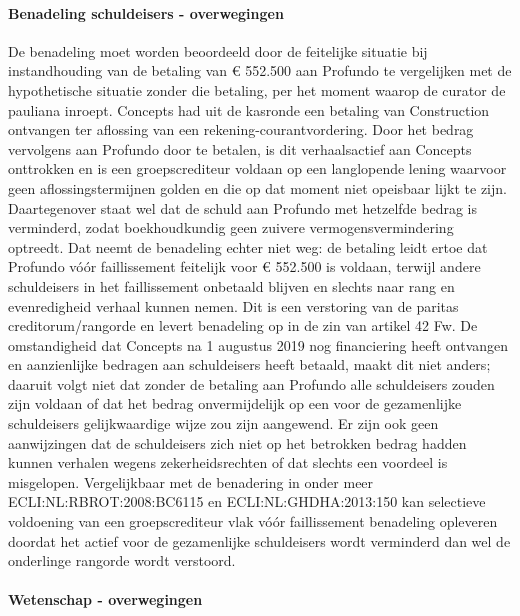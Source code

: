 \documentclass[
  dutch,
  a4paper,
]{article}
\begin{document}
\paragraph{Benadeling schuldeisers - overwegingen}\label{benadeling-schuldeisers---overwegingen-43}

De benadeling moet worden beoordeeld door de feitelijke situatie bij instandhouding van de betaling van € 552.500 aan Profundo te vergelijken met de hypothetische situatie zonder die betaling, per het moment waarop de curator de pauliana inroept. Concepts had uit de kasronde een betaling van Construction ontvangen ter aflossing van een rekening-courantvordering. Door het bedrag vervolgens aan Profundo door te betalen, is dit verhaalsactief aan Concepts onttrokken en is een groepscrediteur voldaan op een langlopende lening waarvoor geen aflossingstermijnen golden en die op dat moment niet opeisbaar lijkt te zijn. Daartegenover staat wel dat de schuld aan Profundo met hetzelfde bedrag is verminderd, zodat boekhoudkundig geen zuivere vermogensvermindering optreedt. Dat neemt de benadeling echter niet weg: de betaling leidt ertoe dat Profundo vóór faillissement feitelijk voor € 552.500 is voldaan, terwijl andere schuldeisers in het faillissement onbetaald blijven en slechts naar rang en evenredigheid verhaal kunnen nemen. Dit is een verstoring van de paritas creditorum/rangorde en levert benadeling op in de zin van artikel 42 Fw. De omstandigheid dat Concepts na 1 augustus 2019 nog financiering heeft ontvangen en aanzienlijke bedragen aan schuldeisers heeft betaald, maakt dit niet anders; daaruit volgt niet dat zonder de betaling aan Profundo alle schuldeisers zouden zijn voldaan of dat het bedrag onvermijdelijk op een voor de gezamenlijke schuldeisers gelijkwaardige wijze zou zijn aangewend. Er zijn ook geen aanwijzingen dat de schuldeisers zich niet op het betrokken bedrag hadden kunnen verhalen wegens zekerheidsrechten of dat slechts een voordeel is misgelopen. Vergelijkbaar met de benadering in onder meer ECLI:NL:RBROT:2008:BC6115 en ECLI:NL:GHDHA:2013:150 kan selectieve voldoening van een groepscrediteur vlak vóór faillissement benadeling opleveren doordat het actief voor de gezamenlijke schuldeisers wordt verminderd dan wel de onderlinge rangorde wordt verstoord.

\paragraph{Wetenschap - overwegingen}\label{wetenschap---overwegingen-43}
\end{document}
